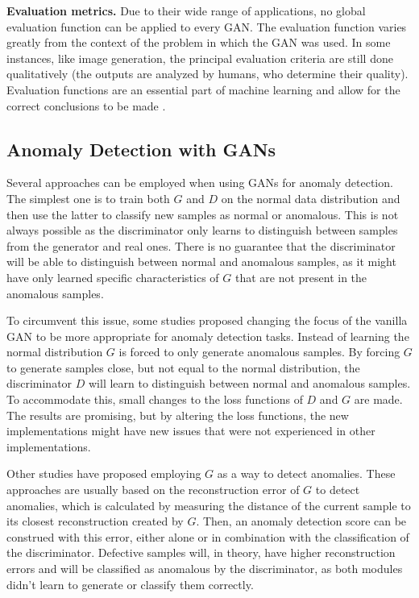\noindent\textbf{Evaluation metrics.} Due to their wide range of applications, no global evaluation function can be applied to every GAN. The evaluation function varies greatly from the context of the problem in which the GAN was used. In some instances, like image generation, the principal evaluation criteria are still done qualitatively (the outputs are analyzed by humans, who determine their quality). Evaluation functions are an essential part of machine learning and allow for the correct conclusions to be made \cite{saxena.cao_GenerativeAdversarialNetworks_2022}.

\subsection{Anomaly Detection with GANs}\label{sec:gan_anomaly_detection}
Several approaches can be employed when using GANs for anomaly detection. The simplest one is to train both $G$ and $D$ on the normal data distribution and then use the latter to classify new samples as normal or anomalous. This is not always possible as the discriminator only learns to distinguish between samples from the generator and real ones. There is no guarantee that the discriminator will be able to distinguish between normal and anomalous samples, as it might have only learned specific characteristics of $G$ that are not present in the anomalous samples.

To circumvent this issue, some studies \cite{ngo.etal_FenceGANBetter_2019, liu.etal_GenerativeAdversarialActive_2020} proposed changing the focus of the vanilla GAN to be more appropriate for anomaly detection tasks. Instead of learning the normal distribution $G$ is forced to only generate anomalous samples. By forcing $G$ to generate samples close, but not equal to the normal distribution, the discriminator $D$ will learn to distinguish between normal and anomalous samples. To accommodate this, small changes to the loss functions of $D$ and $G$ are made. The results are promising, but by altering the loss functions, the new implementations might have new issues that were not experienced in other implementations.

Other studies \cite{li.etal_MADGANMultivariateAnomaly_2019, zenati.etal_AdversariallyLearnedAnomaly_2018, bashar.nayak_TAnoGANTimeSeries_2020} have proposed employing $G$ as a way to detect anomalies. These approaches are usually based on the reconstruction error of $G$ to detect anomalies, which is calculated by measuring the distance of the current sample to its closest reconstruction created by $G$. Then, an anomaly detection score can be construed with this error, either alone or in combination with the classification of the discriminator. Defective samples will, in theory, have higher reconstruction errors and will be classified as anomalous by the discriminator, as both modules didn't learn to generate or classify them correctly.


